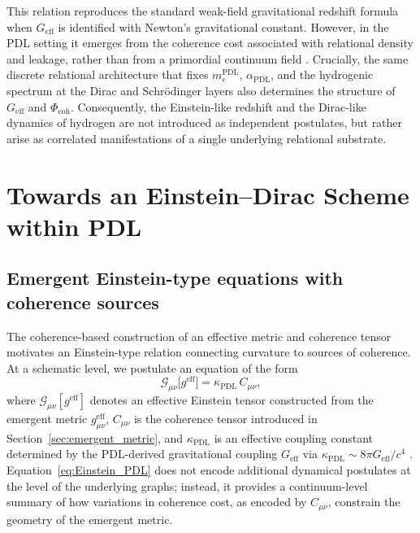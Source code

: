 \documentclass[11pt,a4paper]{article}
\theoremstyle{definition}
\newcommand{\PDL}{\mathrm{PDL}}
\newcommand{\Geff}{G_{\mathrm{eff}}}
\newcommand{\alphaPDL}{\alpha_{\mathrm{PDL}}}
\newcommand{\Ccoh}{C_{\mu\nu}} %
\begin{document}
This relation reproduces the standard weak-field gravitational redshift formula when $\Geff$ is identified with Newton’s gravitational constant. However, in the PDL setting it emerges from the coherence cost associated with relational density and leakage, rather than from a primordial continuum field \cite{PDL_Global_Mapping_Structures_Results_Open_Problems,A_Topological_Reformulation_in_the_Projective_Dynamic_Logo_Framework_Hierarchical_Coherence_Filtering_and_the_Exponent_18_in_PDL}. Crucially, the same discrete relational architecture that fixes $m_e^{\PDL}$, $\alphaPDL$, and the hydrogenic spectrum at the Dirac and Schr\"odinger layers also determines the structure of $\Geff$ and $\Phi_{\mathrm{coh}}$. Consequently, the Einstein-like redshift and the Dirac-like dynamics of hydrogen are not introduced as independent postulates, but rather arise as correlated manifestations of a single underlying relational substrate.

\section{Towards an Einstein–Dirac Scheme within PDL}\label{sec:Einstein_Dirac_scheme}

\subsection{Emergent Einstein-type equations with coherence sources}

The coherence-based construction of an effective metric and coherence tensor motivates an Einstein-type relation connecting curvature to sources of coherence. At a schematic level, we postulate an equation of the form
\begin{equation}
\mathcal{G}_{\mu\nu}\big[g^{\mathrm{eff}}\big] = \kappa_{\PDL}\,\Ccoh,
\label{eq:Einstein_PDL}
\end{equation}
where $\mathcal{G}_{\mu\nu}[g^{\mathrm{eff}}]$ denotes an effective Einstein tensor constructed from the emergent metric $g_{\mu\nu}^{\mathrm{eff}}$, $\Ccoh$ is the coherence tensor introduced in Section~\ref{sec:emergent_metric}, and $\kappa_{\PDL}$ is an effective coupling constant determined by the PDL-derived gravitational coupling $\Geff$ via $\kappa_{\PDL}\sim 8\pi \Geff/c^4$ \cite{PDL,PDL_Global_Mapping_Structures_Results_Open_Problems}. Equation~\eqref{eq:Einstein_PDL} does not encode additional dynamical postulates at the level of the underlying graphs; instead, it provides a continuum-level summary of how variations in coherence cost, as encoded by $\Ccoh$, constrain the geometry of the emergent metric.
\end{document}
